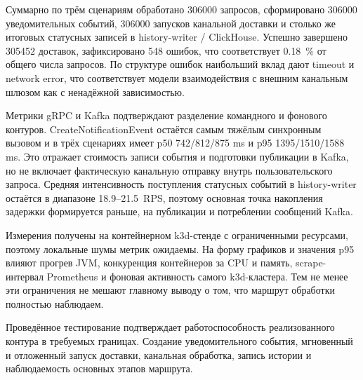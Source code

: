 Суммарно по трём сценариям обработано 306000 запросов, сформировано 306000 уведомительных событий, 306000 запусков канальной доставки и столько же итоговых статусных записей в history-writer / ClickHouse. Успешно завершено 305452 доставок, зафиксировано 548 ошибок, что соответствует 0.18~\% от общего числа запросов. По структуре ошибок наибольший вклад дают timeout и network error, что соответствует модели взаимодействия с внешним канальным шлюзом как с ненадёжной зависимостью.

Метрики gRPC и Kafka подтверждают разделение командного и фонового контуров. CreateNotificationEvent остаётся самым тяжёлым синхронным вызовом и в трёх сценариях имеет p50 742/812/875 ms и p95 1395/1510/1588 ms. Это отражает стоимость записи события и подготовки публикации в Kafka, но не включает фактическую канальную отправку внутрь пользовательского запроса. Средняя интенсивность поступления статусных событий в history-writer остаётся в диапазоне 18.9--21.5~RPS, поэтому основная точка накопления задержки формируется раньше, на публикации и потреблении сообщений Kafka.

Измерения получены на контейнерном k3d-стенде с ограниченными ресурсами, поэтому локальные шумы метрик ожидаемы. На форму графиков и значения p95 влияют прогрев JVM, конкуренция контейнеров за CPU и память, scrape-интервал Prometheus и фоновая активность самого k3d-кластера. Тем не менее эти ограничения не мешают главному выводу о том, что маршрут обработки полностью наблюдаем.

Проведённое тестирование подтверждает работоспособность реализованного контура в требуемых границах. Создание уведомительного события, мгновенный и отложенный запуск доставки, канальная обработка, запись истории и наблюдаемость основных этапов маршрута.





